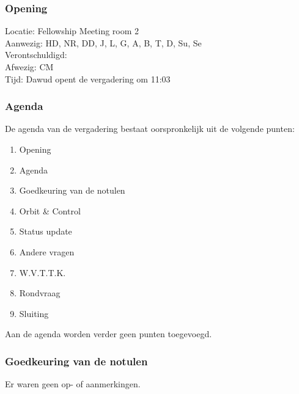 \subsubsection{Opening}
Locatie: Fellowship Meeting room 2\\
Aanwezig: HD, NR, DD, J, L, G, A, B, T, D, Su, Se\\
Verontschuldigd: \\
Afwezig: CM \\
Tijd: Dawud opent de vergadering om 11:03\\

\subsubsection{Agenda}
De agenda van de vergadering bestaat oorspronkelijk uit de volgende punten:
\begin{enumerate}
\item Opening
\item Agenda
\item Goedkeuring van de notulen
\item Orbit \& Control
\item Status update
\item Andere vragen
\item W.V.T.T.K.
\item Rondvraag
\item Sluiting
\end{enumerate}

Aan de agenda worden verder geen punten toegevoegd.

\subsubsection{Goedkeuring van de notulen}
Er waren geen op- of aanmerkingen.

